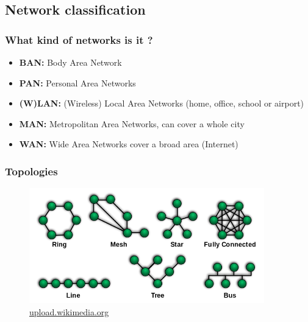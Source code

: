 \subsection{Network classification}
  \begin{frame}
    \frametitle{What kind of networks is it ?}
      \begin{itemize}
        \item \textbf{BAN:} Body Area Network\pause
        \item \textbf{PAN:} Personal Area Networks\pause
        \item \textbf{(W)LAN:} (Wireless) Local Area Networks (home, office, school or airport)\pause
        \item \textbf{MAN:} Metropolitan Area Networks, can cover a whole city\pause
        \item \textbf{WAN:} Wide Area Networks cover a broad area (Internet)
      \end{itemize}
  \end{frame}
  \begin{frame}
    \frametitle{Topologies}
    \begin{figure}[t]
      \centering
      \includegraphics[height=5cm]{./imgs/topologies.png}
      \caption{\color{blue}\href{https://upload.wikimedia.org/wikipedia/commons/thumb/9/97/NetworkTopologies.svg/640px-NetworkTopologies.svg.png}{upload.wikimedia.org}}
      \label{fig:ntwks}
    \end{figure}
      \end{frame}
